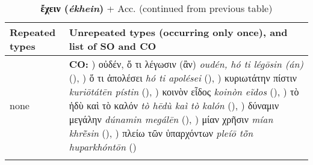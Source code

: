\documentclass[output=paper,colorlinks,citecolor=brown]{langscibook}
\begin{document}
\begin{table}
\caption{\textbf{ἔχειν (\textit{ékhein})} + Acc. (continued from previous table)}
\footnotesize
\begin{tabularx}{\textwidth}{QQ}
        \lsptoprule
        Repeated types%
        & Unrepeated types (occurring only once), and list of SO and CO     \\
        \midrule
none &
\textbf{CO:}
) οὐδέν, ὅ τι λέγωσιν (ἂν) \textit{oudén, hó ti légōsin (án)} (),
) ὅ τι ἀπολέσει \textit{hó ti apolései} (),
) κυριωτάτην πίστιν \textit{kuriōtátēn pístin} (),
) κοινὸν εἶδος \textit{koinòn eĩdos} (),
) τὸ ἡδὺ καὶ τὸ καλόν \textit{tò hēdù kaì tò kalón} (),
) δύναμιν μεγάλην \textit{dúnamin megálēn} (),
) μίαν χρῆσιν \textit{mían khrē̃sin} (),
) πλείω τῶν ὑπαρχόντων \textit{pleíō tō̃n huparkhóntōn} ()\\
        \lspbottomrule
\end{tabularx}
\end{table}
\end{document}
